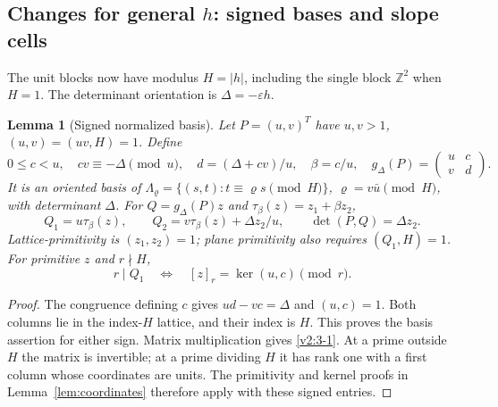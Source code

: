 \documentclass[11pt]{article}
\newtheorem{lemma}[theorem]{Lemma}
\theoremstyle{definition}
\newcommand{\Z}{\mathbb Z}
\theoremstyle{remark}
\numberwithin{equation}{section}
\begin{document}
\subsection{Changes for general \texorpdfstring{$h$}{h}: signed bases and slope cells}
\label{subsec:affine-geometry}
The unit blocks now have modulus $H=|h|$, including the single
block $\Z^2$ when $H=1$. The determinant orientation is
$\Delta=-\varepsilon h$.
\begin{lemma}[Signed normalized basis]\label{lem:affine-basis}
Let $P=(u,v)^T$ have $u,v>1$, $(u,v)=(uv,H)=1$. Define
\begin{equation}\label{eq:affine-basis}
 0\le c<u,\quad cv\equiv-\Delta\pmod u,\quad
 d=(\Delta+cv)/u,\quad\beta=c/u,\quad
 g_\Delta(P)=\begin{pmatrix}u&c\\v&d\end{pmatrix}.
\end{equation}
It is an oriented basis of
$\Lambda_\varrho=\{(s,t):t\equiv\varrho s\pmod H\}$,
$\varrho=v\bar u\pmod H$, with determinant $\Delta$.
For $Q=g_\Delta(P)z$ and $\tau_\beta(z)=z_1+\beta z_2$,
\begin{equation}\label{v2:3-1}
 Q_1=u\tau_\beta(z),\qquad
 Q_2=v\tau_\beta(z)+\Delta z_2/u,\qquad
 \det(P,Q)=\Delta z_2.
\end{equation}
Lattice-primitivity is $(z_1,z_2)=1$; plane primitivity also
requires $(Q_1,H)=1$. For primitive $z$ and $r\nmid H$,
\begin{equation}\label{v2:3-2}
 r\mid Q_1\quad\Longleftrightarrow\quad
 [z]_r=\ker(u,c)\pmod r.
\end{equation}
\end{lemma}
\begin{proof}
The congruence defining $c$ gives $ud-vc=\Delta$ and
$(u,c)=1$. Both columns lie in the index-$H$ lattice, and their
index is $H$. This proves the basis assertion for either sign.
Matrix multiplication gives \eqref{v2:3-1}. At a prime outside
$H$ the matrix is invertible; at a prime dividing $H$ it has rank
one with a first column whose coordinates are units. The
primitivity and kernel proofs in Lemma~\ref{lem:coordinates}
therefore apply with these signed entries.
\end{proof}
\end{document}

